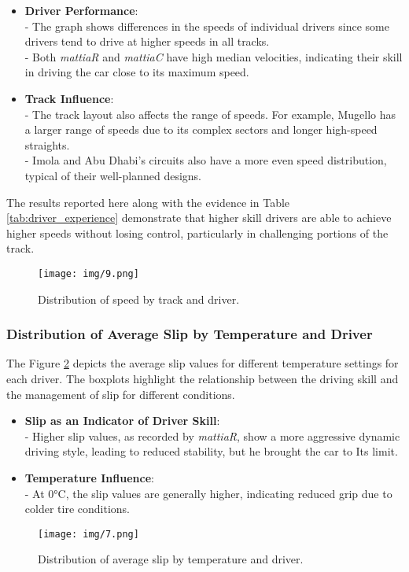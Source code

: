 \documentclass[a4paper,final,12pt]{report}
\begin{document}
\begin{itemize}
    \item \textbf{Driver Performance}:\\
    - The graph shows differences in the speeds of individual drivers since some drivers tend to drive at higher speeds in all tracks.\\
    - Both \textit{mattiaR} and \textit{mattiaC} have high median velocities, indicating their skill in driving the car close to its maximum speed.

    \item \textbf{Track Influence}:\\
    - The track layout also affects the range of speeds. For example, Mugello has a larger range of speeds due to its complex sectors and longer high-speed straights.\\
    - Imola and Abu Dhabi's circuits also have a more even speed distribution, typical of their well-planned designs.\\

\end{itemize}
The results reported here along with the evidence in Table \ref{tab:driver_experience} demonstrate that higher skill drivers are able to achieve higher speeds without losing control, particularly in challenging portions of the track.

\begin{figure}[H]
    \centering
    \texttt{[image: img/9.png]}
    \caption{Distribution of speed by track and driver.}
    \label{fig:speed_distribution_driver}
\end{figure}

\subsubsection{Distribution of Average Slip by Temperature and Driver}
The Figure \ref{fig:slip_distribution_driver} depicts the average slip values for different temperature settings for each driver. The boxplots highlight the relationship between the driving skill and the management of slip for different conditions.

\begin{itemize}
    \item \textbf{Slip as an Indicator of Driver Skill}:\\
    - Higher slip values, as recorded by \textit{mattiaR}, show a more aggressive dynamic driving style, leading to reduced stability, but he brought the car to Its limit.
    \item \textbf{Temperature Influence}:\\
    - At 0°C, the slip values are generally higher, indicating reduced grip due to colder tire conditions.

\end{itemize}
\begin{figure}[H]
    \centering
    \texttt{[image: img/7.png]}
    \caption{Distribution of average slip by temperature and driver.}
    \label{fig:slip_distribution_driver}
\end{figure}
\end{document}

